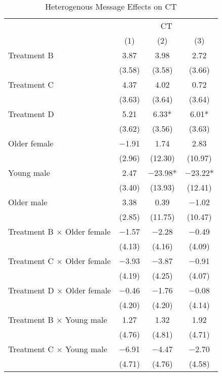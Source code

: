 \documentclass[12pt, a4paper]{article}
\begin{document}
\begin{table}[H]

\caption{\label{tab:test-lm-interaction-reg}Heterogenous Message Effects on CT}
\centering
\fontsize{8}{10}\selectfont
\begin{threeparttable}
\begin{tabular}[t]{lccc}
\toprule
\multicolumn{1}{c}{ } & \multicolumn{3}{c}{CT} \\
\cmidrule(l{3pt}r{3pt}){2-4}
  & (1) & (2) & (3)\\
\midrule
Treatment B & \num{3.87} & \num{3.98} & \num{2.72}\\
 & (\num{3.58}) & (\num{3.58}) & (\num{3.66})\\
Treatment C & \num{4.37} & \num{4.02} & \num{0.72}\\
 & (\num{3.63}) & (\num{3.64}) & (\num{3.64})\\
Treatment D & \num{5.21} & \num{6.33}* & \num{6.01}*\\
 & (\num{3.62}) & (\num{3.56}) & (\num{3.63})\\
Older female & \num{-1.91} & \num{1.74} & \num{2.83}\\
 & (\num{2.96}) & (\num{12.30}) & (\num{10.97})\\
Young male & \num{2.47} & \num{-23.98}* & \num{-23.22}*\\
 & (\num{3.40}) & (\num{13.93}) & (\num{12.41})\\
Older male & \num{3.38} & \num{0.39} & \num{-1.02}\\
 & (\num{2.85}) & (\num{11.75}) & (\num{10.47})\\
Treatment B $\times$ Older female & \num{-1.57} & \num{-2.28} & \num{-0.49}\\
 & (\num{4.13}) & (\num{4.16}) & (\num{4.09})\\
Treatment C $\times$ Older female & \num{-3.93} & \num{-3.87} & \num{-0.91}\\
 & (\num{4.19}) & (\num{4.25}) & (\num{4.07})\\
Treatment D $\times$ Older female & \num{-0.46} & \num{-1.76} & \num{-0.08}\\
 & (\num{4.20}) & (\num{4.20}) & (\num{4.14})\\
Treatment B $\times$ Young male & \num{1.27} & \num{1.32} & \num{1.92}\\
 & (\num{4.76}) & (\num{4.81}) & (\num{4.71})\\
Treatment C $\times$ Young male & \num{-6.91} & \num{-4.47} & \num{-2.70}\\
 & (\num{4.71}) & (\num{4.76}) & (\num{4.58})\\

\end{tabular}
\end{threeparttable}
\end{table}
\end{document}

